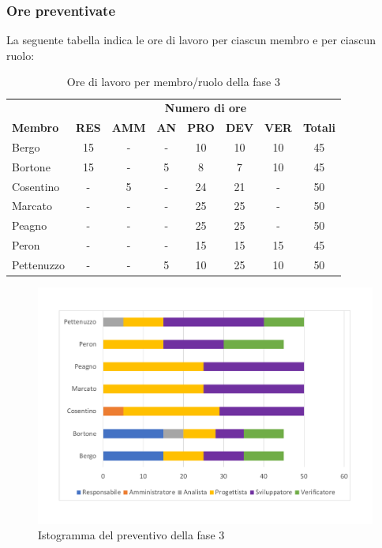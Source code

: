 	\subsubsection{Ore preventivate}
		La seguente tabella indica le ore di lavoro per ciascun membro e per ciascun ruolo:
		\begin{table}[H]
			\centering
			\begin{tabular}{| l | c c c c c c | c |}
				\rowcolor{LightBlue}
				& \multicolumn{7}{c}{\textbf{\color{white}Numero di ore}}	\\
	
				\rowcolor{LightBlue}
				\textbf{\color{white}Membro}
				& \textbf{\color{white}RES}
				& \textbf{\color{white}AMM}
				& \textbf{\color{white}AN}
				& \textbf{\color{white}PRO}
				& \textbf{\color{white}DEV}
				& \textbf{\color{white}VER}
				& \textbf{\color{white}Totali}\\
	
				Bergo      & 15 & - & - & 10 & 10 & 10 & 45 \\
				Bortone    & 15 & - & 5 & 8 & 7 & 10 & 45  \\
				Cosentino  & - & 5 & - & 24 & 21 & - & 50 \\
				Marcato    & - & - & - & 25 & 25 & - & 50 \\
				Peagno     & - & - & - & 25 & 25 & - & 50 \\
				Peron      & - & - & - & 15 & 15 & 15 & 45 \\
				Pettenuzzo & - & - & 5 & 10 & 25 & 10 & 50 \\ \hline
			\end{tabular}
			\caption{Ore di lavoro per membro/ruolo della fase 3}
		\end{table}
		
	\begin{figure}[h]
	\centering
	\includegraphics[scale=0.45]{images/preventivoRQ.pdf}
	\caption{Istogramma del preventivo della fase 3}
\end{figure}

